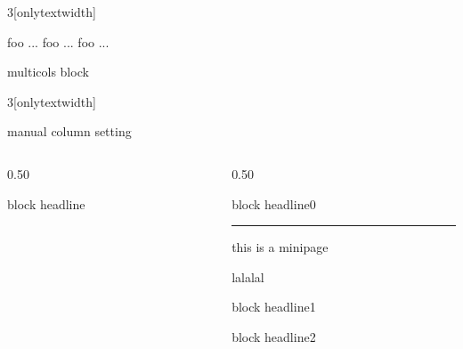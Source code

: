 \documentclass[final]{beamer}
\begin{document}
\begin{frame}[t]
\begin{multicols}{3}[onlytextwidth]
\lipsum[3]

\lipsum[4]

\lipsum[5-8]


foo ...
foo ...
foo ...

\end{multicols}

\begin{block}{multicols block}
\begin{multicols}{3}[onlytextwidth]
\lipsum[1-4]
\end{multicols}
\end{block}
\end{frame}


\begin{frame}[t]{manual column setting}
\begin{block}
\maketitle
\end{block}
\begin{columns}

\begin{column}{0.50\textwidth}
\begin{block}{block headline}
\lipsum
\end{block}
\end{column}

\begin{column}{0.50\textwidth}
\begin{block}{block headline0}
\lipsum[1]
\end{block}

\begin{minipage}[c]{.65\textwidth}
\hrule
this is a 
minipage

lalalal
\end{minipage}

\begin{block}{block headline1}
\lipsum[1]
\end{block}

\begin{block}{block headline2}
\lipsum[2]
\end{block}


\end{column}
\end{columns}

\end{frame}
\end{document}
